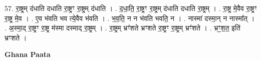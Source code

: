 \documentclass[17pt]{extarticle}
\begin{document}
57. रा॒ष्ट्रम् द॑धाति दधाति रा॒ष्ट्रꣳ रा॒ष्ट्रम् द॑धाति । . द॒धा॒ति॒ रा॒ष्ट्रꣳ रा॒ष्ट्रम् द॑धाति दधाति रा॒ष्ट्रम् । . रा॒ष्ट्र मे॒वैव रा॒ष्ट्रꣳ रा॒ष्ट्र मे॒व । . ए॒व भ॑वति भव त्ये॒वैव भ॑वति । . भ॒व॒ति॒ न न भ॑वति भवति॒ न । . नास्मा॑ दस्मा॒न् न नास्मा᳚त् । . अ॒स्मा॒द् रा॒ष्ट्रꣳ रा॒ष्ट्र म॑स्मा दस्माद् रा॒ष्ट्रम् । . रा॒ष्ट्रम् भ्रꣳ॑शते भ्रꣳशते रा॒ष्ट्रꣳ रा॒ष्ट्रम् भ्रꣳ॑शते । . भ्रꣳ॒॒श॒त॒ इति॑ भ्रꣳशते । \newline

\textbf{Ghana Paata } \newline
\end{document}
